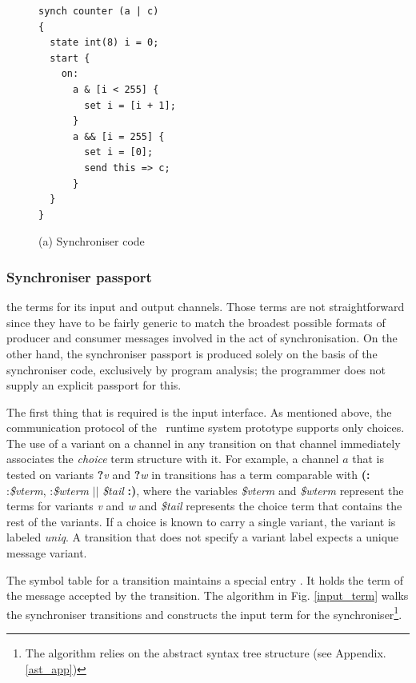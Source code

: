 \begin{figure}[h!]
\begin{lstlisting}[frame=single]
synch counter (a | c)
{
  state int(8) i = 0;
  start {
    on:
      a & [i < 255] {
        set i = [i + 1];
      }
      a && [i = 255] {
        set i = [0];
        send this => c;
      }
  }
}
\end{lstlisting}
\caption{(a) Synchroniser code}
\label{sync_ast}
\end{figure}


  \subsubsection*{Synchroniser passport}
 the  terms for its input and output channels. Those terms are not straightforward since they have to be fairly generic to match the broadest possible formats of producer and consumer messages involved in the act of synchronisation. On the other hand, the synchroniser passport is produced solely on the basis of the synchroniser code, exclusively by program analysis; the programmer does not supply an explicit passport for this.

The first thing that is required is the input interface. As mentioned above, the communication protocol of the \ak\ runtime system prototype supports only choices. The use of a variant on a channel in any transition on that channel immediately associates the \emph{choice} term structure with it. For example, a channel $a$ that is tested on variants \textbf{?}\emph{v} and \textbf{?}\emph{w} in transitions has a term comparable with \textbf{(:} :\emph{\$vterm}, :\emph{\$wterm} $||$ \emph{\$tail} \textbf{:)}, where the variables \emph{\$vterm} and \emph{\$wterm} represent the terms for variants \emph{v} and \emph{w} and \emph{\$tail} represents the choice term that contains the rest of the variants. If a choice is known to carry a single variant, the variant is labeled \emph{uniq}. A transition that does not specify a variant label expects a unique message variant.

The symbol table for a transition maintains a special entry . It holds the term of the message accepted by the transition. The algorithm in Fig. \ref{input_term} walks the synchroniser transitions and constructs the input term for the synchroniser\footnote{The algorithm relies on the abstract syntax tree structure (see Appendix. \ref{ast_app})}.

